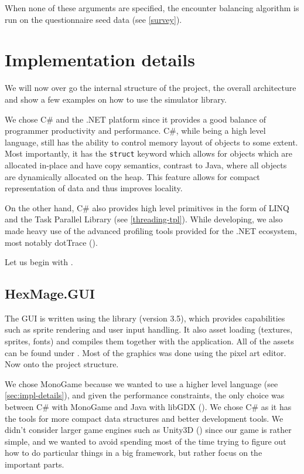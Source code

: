 When none of these arguments are specified, the encounter balancing algorithm is run on the questionnaire seed data (see \autoref{survey}).

\section{Implementation details}
\label{sec:impl-details}

We will now over go the internal structure of the project, the overall architecture and show a few examples on how to use the simulator library.

We chose C\# and the .NET platform since it provides a good balance of programmer productivity and performance. C\#, while being a high level language, still has the ability to control memory layout of objects to some extent. Most importantly, it has the \verb|struct| keyword which allows for objects which are allocated in-place and have copy semantics, contrast to Java, where all objects are dynamically allocated on the heap. This feature allows for compact representation of data and thus improves locality.

On the other hand, C\# also provides high level primitives in the form of LINQ and the Task Parallel Library \citep{tpl} (see \autoref{threading-tpl}). While developing, we also made heavy use of the advanced profiling tools provided for the .NET ecosystem, most notably dotTrace (\citet{dot-trace}).




Let us begin with .

\subsection{HexMage.GUI}


The GUI is written using the \citet{monogame} library (version 3.5), which provides capabilities such as sprite rendering and user input handling. It also asset loading (textures, sprites, fonts) and compiles them together with the application. All of the assets can be found under . Most of the graphics was done using the \citet{aseprite} pixel art editor. Now onto the project structure.

We chose MonoGame because we wanted to use a higher level language (see \autoref{sec:impl-details}), and given the performance constraints, the only choice was between C\# with MonoGame and Java with libGDX (\citet{libgdx}). We chose C\# as it has the tools for more compact data structures and better development tools. We didn't consider larger game engines such as Unity3D (\citet{unity3d}) since our game is rather simple, and we wanted to avoid spending most of the time trying to figure out how to do particular things in a big framework, but rather focus on the important parts.


